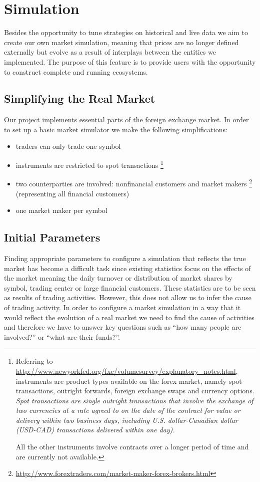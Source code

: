 \section{Simulation}
Besides the opportunity to tune strategies on historical and live data we aim to
create our own market simulation, meaning that prices are no longer defined 
externally but evolve as a result of interplays between the entities we implemented.
The purpose of this feature is to provide users with the opportunity to construct
complete and running ecosystems.

\subsection{Simplifying the Real Market}
Our project implements essential parts of the foreign exchange market.
In order to set up a basic market simulator we make the following
simplifications:

\begin{itemize}
    \item traders can only trade one symbol
    \item instruments are restricted to spot transactions
        \footnote{Referring to \url{http://www.newyorkfed.org/fxc/volumesurvey/explanatory_notes.html},
        instruments
        are product types available on the forex market, namely spot transactions, outright
        forwards, foreign exchange swaps and currency options. \textit{Spot transactions are single 
        outright transactions that involve the exchange of two currencies at a rate agreed 
        to on the date of the contract for value or delivery within two business days, including 
        U.S. dollar-Canadian dollar (USD-CAD) transactions delivered within one day).}

        All the other instruments involve contracts over a longer period of time and are
        currently not available.}


    \item two counterparties are involved: nonfinancial customers and market makers
        \footnote{\url{http://www.forextraders.com/market-maker-forex-brokers.html}}
        (representing all financial customers)
    \item one market maker per symbol
\end{itemize}

\subsection{Initial Parameters}
Finding appropriate parameters to configure a simulation that reflects the
true market has become a difficult task since existing statistics focus on 
the effects of the market meaning the daily turnover or distribution of market
shares by symbol, trading center or large financial customers. These statistics
are to be seen as results of trading activities. However, this does not allow
us to infer the cause of trading activity. In order to configure a market
simulation in a way that it would reflect the evolution of a real market we 
need to find the cause of activities and therefore we have to answer key questions
such as ``how many people are involved?'' or ``what are their funds?''.

